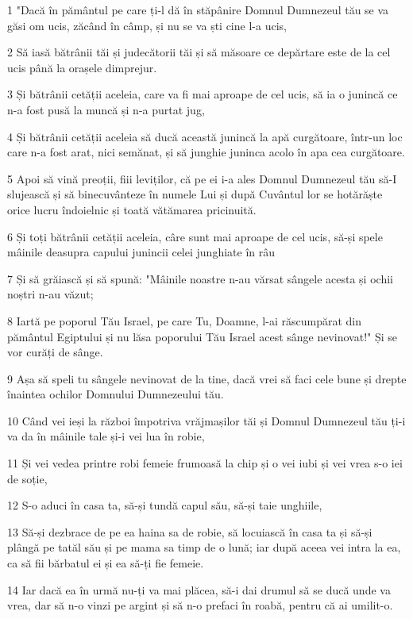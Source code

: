\par 1 "Dacă în pământul pe care ți-l dă în stăpânire Domnul Dumnezeul tău se va găsi om ucis, zăcând în câmp, și nu se va ști cine l-a ucis,
\par 2 Să iasă bătrânii tăi și judecătorii tăi și să măsoare ce depărtare este de la cel ucis până la orașele dimprejur.
\par 3 Și bătrânii cetății aceleia, care va fi mai aproape de cel ucis, să ia o junincă ce n-a fost pusă la muncă și n-a purtat jug,
\par 4 Și bătrânii cetății aceleia să ducă această junincă la apă curgătoare, într-un loc care n-a fost arat, nici semănat, și să junghie juninca acolo în apa cea curgătoare.
\par 5 Apoi să vină preoții, fiii leviților, că pe ei i-a ales Domnul Dumnezeul tău să-I slujească și să binecuvânteze în numele Lui și după Cuvântul lor se hotărăște orice lucru îndoielnic și toată vătămarea pricinuită.
\par 6 Și toți bătrânii cetății aceleia, câre sunt mai aproape de cel ucis, să-și spele mâinile deasupra capului junincii celei junghiate în râu
\par 7 Și să grăiască și să spună: "Mâinile noastre n-au vărsat sângele acesta și ochii noștri n-au văzut;
\par 8 Iartă pe poporul Tău Israel, pe care Tu, Doamne, l-ai răscumpărat din pământul Egiptului și nu lăsa poporului Tău Israel acest sânge nevinovat!" Și se vor curăți de sânge.
\par 9 Așa să speli tu sângele nevinovat de la tine, dacă vrei să faci cele bune și drepte înaintea ochilor Domnului Dumnezeului tău.
\par 10 Când vei ieși la război împotriva vrăjmașilor tăi și Domnul Dumnezeul tău ți-i va da în mâinile tale și-i vei lua în robie,
\par 11 Și vei vedea printre robi femeie frumoasă la chip și o vei iubi și vei vrea s-o iei de soție,
\par 12 S-o aduci în casa ta, să-și tundă capul său, să-și taie unghiile,
\par 13 Să-și dezbrace de pe ea haina sa de robie, să locuiască în casa ta și să-și plângă pe tatăl său și pe mama sa timp de o lună; iar după aceea vei intra la ea, ca să fii bărbatul ei și ea să-ți fie femeie.
\par 14 Iar dacă ea în urmă nu-ți va mai plăcea, să-i dai drumul să se ducă unde va vrea, dar să n-o vinzi pe argint și să n-o prefaci în roabă, pentru că ai umilit-o.
